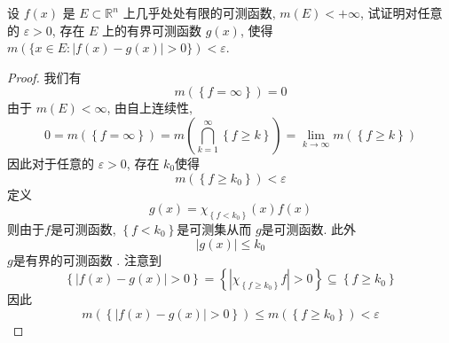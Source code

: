 \documentclass[../main.tex]{subfiles}
\begin{document}
\begin{exercise}{}{}
    设 $f(x)$ 是 $E \subset \mathbb{R}^n$ 上几乎处处有限的可测函数, $m(E) < +\infty$, 试证明对任意的 $\varepsilon >0$, 存在 $E$ 上的有界可测函数 $g(x)$, 使得
$m(\{x \in E: |f(x)-g(x)|>0\}) < \varepsilon.$
\end{exercise}
\begin{proof}
    我们有 \[
    m\left( \left\{ f= \infty \right\} \right)= 0 
    \]由于 \(  m\left( E \right)< \infty   \), 由自上连续性, \[
    0= m\left( \left\{ f= \infty \right\} \right)= m\left( \bigcap _{k = 1}^{\infty}\left\{ f\ge k \right\} \right)=   \lim_{k\to \infty}m\left( \left\{ f\ge k \right\} \right) 
    \]因此对于任意的 \(   \varepsilon > 0  \), 存在 \(  k_0  \)使得 \[
   m\left( \left\{ f\ge k_0 \right\} \right)<  \varepsilon  
    \]  定义 \[
    g\left( x \right)= \chi _{\left\{ f< k_0 \right\}} \left( x \right) f\left( x \right) 
    \]则由于\(  f  \)是可测函数,   \(  \left\{ f< k_0 \right\}  \)是可测集从而 \(  g  \)是可测函数. 此外   \[
    \left| g\left( x \right)  \right|\le k_0 
    \] \(  g  \)是有界的可测函数 . 注意到 \[
   \left\{  \left| f\left( x \right)-g\left( x \right)   \right|> 0 \right\}= \left\{ \left| \chi _{\left\{ f\ge k_0 \right\}} f\right| > 0  \right\}\subseteq \left\{ f\ge k_0 \right\}
    \]因此 \[
    m\left( \left\{ \left| f\left( x \right)-g\left( x \right)   \right|> 0  \right\} \right) \le m\left( \left\{ f\ge k_0 \right\} \right)<  \varepsilon  
    \]
\end{proof}
\end{document}
